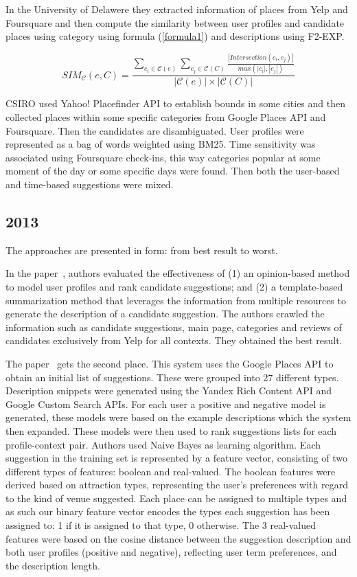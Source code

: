 \documentclass{llncs}
\begin{document}
In the University of Delawere \cite{yang2012exploration} they extracted information of places from Yelp and Foursquare and then compute the similarity between user profiles and candidate places using category using formula (\ref{formula1}) and descriptions using F2-EXP\cite{fang2005exploration}.

\begin{equation} \label{formula1}
SIM_\mathcal{C}(e,C) = \frac{\sum_{c_{i}\in\mathcal{C}(e)}\sum_{c_{j}\in\mathcal{C}(C)}\frac{|Intersection(c_i,c_j)|}{max(|c_i|,|c_j|)}}{|\mathcal{C}(e)|\times|\mathcal{C}(C)|}
\end{equation}

CSIRO \cite{milne2012finding} used Yahoo! Placefinder API to establish bounds in some cities and then collected places within some specific categories from Google Places API and Foursquare. Then the candidates are disambiguated. User profiles were represented as a bag of words weighted using BM25. Time sensitivity was associated using Foursquare check-ins, this way categories popular at some moment of the day or some specific days were found. Then both the user-based and time-based suggestions were mixed.

\subsection{2013}
The approaches are presented in form: from best result to worst.

In the paper~\cite{Yang_2013}, authors evaluated the effectiveness of (1) an opinion-based method to model user profiles and rank candidate suggestions; and (2) a template-based summarization method that leverages the information from multiple resources to generate the description of a candidate suggestion. The authors crawled the information such as candidate suggestions, main page, categories and reviews of candidates exclusively from Yelp for all contexts.  They obtained the best result.

The paper~\cite{Rikitianskii_2013} gets the second place. This system uses the Google Places API to obtain an initial list of suggestions. These were grouped into 27 different types. Description snippets were generated using the Yandex Rich Content API and Google
Custom Search APIs. For each user a positive and negative model is generated, these models were based on
the example descriptions which the system then expanded. These models were then used to rank suggestions
lists for each profile-context pair. Authors used Naive Bayes as learning algorithm. Each suggestion in the training set is represented by a feature vector, consisting of two different types of features: boolean and real-valued. The boolean features were derived based on attraction types, representing the user's preferences with regard to the kind of venue suggested. Each place can be assigned to multiple types and as such our binary feature vector encodes the types each suggestion has been assigned to: 1 if it is assigned to that type, 0 otherwise.
The 3 real-valued features were based on the cosine distance between the suggestion description and both user profiles (positive and negative), reflecting user term preferences, and the description length. 
\end{document}
